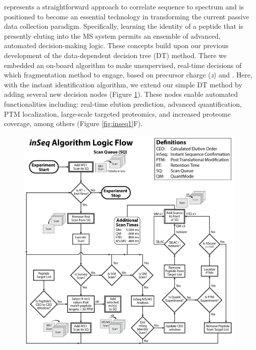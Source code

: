 \inseq{} represents a straightforward approach to correlate sequence to spectrum and is positioned to become an essential technology in transforming the current passive data collection paradigm. Specifically, learning the identity of a peptide that is presently eluting into the MS system permits an ensemble of advanced, automated decision-making logic. These concepts build upon our previous development of the data-dependent decision tree (DT) method. There we embedded an on-board algorithm to make unsupervised, real-time decisions of which fragmentation method to engage, based on precursor charge (\textit{z}) and \mz{}. Here, with the \inseq{} instant identification algorithm, we extend our simple DT method by adding several new decision nodes (Figure \ref{fig:inseqs4}). These nodes enable automated functionalities including: real-time elution prediction, advanced quantification, PTM localization, large-scale targeted proteomics, and increased proteome coverage, among others (Figure \ref{fig:inseq1}F).

\begin{figure}[p]
	\centering
	\includegraphics[width=\columnwidth]{inseq/inSeq_Fig S4.png}
	\label{fig:inseqs4}
\end{figure}

